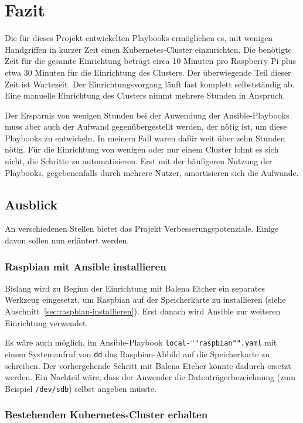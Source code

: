 \chapter{Fazit}\label{ch:fazit}

Die für dieses Projekt entwickelten Playbooks ermöglichen es, mit wenigen Handgriffen in kurzer Zeit einen Kubernetes-Cluster einzurichten.
Die benötigte Zeit für die gesamte Einrichtung beträgt circa 10 Minuten pro Raspberry Pi plus etwa 30 Minuten für die Einrichtung des Clusters.
Der überwiegende Teil dieser Zeit ist Wartezeit.
Der Einrichtungsvorgang läuft fast komplett selbstständig ab.
Eine manuelle Einrichtung des Clusters nimmt mehrere Stunden in Anspruch.

Der Ersparnis von wenigen Stunden bei der Anwendung der Ansible-Playbooks muss aber auch der Aufwand gegenübergestellt werden, der nötig ist, um diese Playbooks zu entwickeln.
In meinem Fall waren dafür weit über zehn Stunden nötig.
Für die Einrichtung von wenigen oder nur einem Cluster lohnt es sich nicht, die Schritte zu automatisieren.
Erst mit der häufigeren Nutzung der Playbooks, gegebenenfalls durch mehrere Nutzer, amortisieren sich die Aufwände.

\section{Ausblick}\label{sec:ausblick}

An verschiedenen Stellen bietet das Projekt Verbesserungspotenziale.
Einige davon sollen nun erläutert werden.

\subsection{Raspbian mit Ansible installieren}

Bislang wird zu Beginn der Einrichtung mit Balena Etcher ein separates Werkzeug eingesetzt, um Raspbian auf der Speicherkarte zu installieren (siehe Abschnitt~\ref{sec:raspbian-installieren}).
Erst danach wird Ansible zur weiteren Einrichtung verwendet.

Es wäre auch möglich, im Ansible-Playbook \texttt{local-""raspbian"".yaml} mit einem Systemaufruf von \texttt{dd} das Raspbian-Abbild auf die Speicherkarte zu schreiben.
Der vorhergehende Schritt mit Balena Etcher könnte dadurch ersetzt werden.
Ein Nachteil wäre, dass der Anwender die Datenträgerbezeichnung (zum Beispiel \texttt{/dev/sdb}) selbst angeben müsste.

\subsection{Bestehenden Kubernetes-Cluster erhalten}

